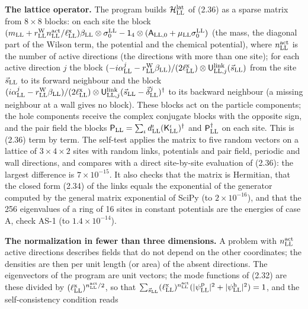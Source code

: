 \documentclass[
  10pt,
]{article}
\begin{document}
\textbf{The lattice operator.} The program builds
\(\mathcal H^{\rm lat}_{\rm LL}\) of (2.36) as a sparse matrix from
\(8\times8\) blocks: on each site the block
\((m_{\rm LL}+r^{\rm W}_{\rm LL}n^{\rm act}_{\rm LL}/\ell^{\rm x}_{\rm LL})\beta_{\rm LL}\otimes\sigma^{\rm LL}_0-\mathsf 1_4\otimes(\mathsf A_{{\rm LL},0}+\mu_{\rm LL}\sigma^{\rm LL}_0)\)
(the mass, the diagonal part of the Wilson term, the potential and the
chemical potential), where \(n^{\rm act}_{\rm LL}\) is the number of
active directions (the directions with more than one site); for each
active direction \(j\) the block
\((-i\alpha^j_{\rm LL}-r^{\rm W}_{\rm LL}\beta_{\rm LL})/(2\ell^{\rm x}_{\rm LL})\otimes\mathsf U^{\rm link}_{{\rm LL},j}(\vec s_{\rm LL})\)
from the site \(\vec s_{\rm LL}\) to its forward neighbour and the block
\((i\alpha^j_{\rm LL}-r^{\rm W}_{\rm LL}\beta_{\rm LL})/(2\ell^{\rm x}_{\rm LL})\otimes\mathsf U^{\rm link}_{{\rm LL},j}(\vec s_{\rm LL}-\vec\delta^j_{\rm LL})^\dagger\)
to its backward neighbour (a missing neighbour at a wall gives no
block). These blocks act on the particle components; the hole components
receive the complex conjugate blocks with the opposite sign, and the
pair field the blocks
\(\mathsf P_{\rm LL}=\sum_\iota d^\iota_{\rm LL}(\mathsf K^\iota_{\rm LL})^\dagger\)
and \(\mathsf P^\dagger_{\rm LL}\) on each site. This is (2.36) term by
term. The self-test applies the matrix to five random vectors on a
lattice of \(3\times4\times2\) sites with random links, potentials and
pair field, periodic and wall directions, and compares with a direct
site-by-site evaluation of (2.36): the largest difference is
\(7\times10^{-15}\). It also checks that the matrix is Hermitian, that
the closed form (2.34) of the links equals the exponential of the
generator computed by the general matrix exponential of SciPy (to
\(2\times10^{-16}\)), and that the 256 eigenvalues of a ring of 16 sites
in constant potentials are the energies of case A, check AS-1 (to
\(1.4\times10^{-14}\)).

\textbf{The normalization in fewer than three dimensions.} A problem
with \(n^{\rm act}_{\rm LL}\) active directions describes fields that do
not depend on the other coordinates; the densities are then per unit
length (or area) of the absent directions. The eigenvectors of the
program are unit vectors; the mode functions of (2.32) are these divided
by \((\ell^{\rm x}_{\rm LL})^{n^{\rm act}_{\rm LL}/2}\), so that
\(\sum_{\vec s_{\rm LL}}(\ell^{\rm x}_{\rm LL})^{n^{\rm act}_{\rm LL}}(\lvert\psi^{\rm p}_{\rm LL}\rvert^2+\lvert\psi^{\rm h}_{\rm LL}\rvert^2)=1\),
and the self-consistency condition reads
\end{document}
